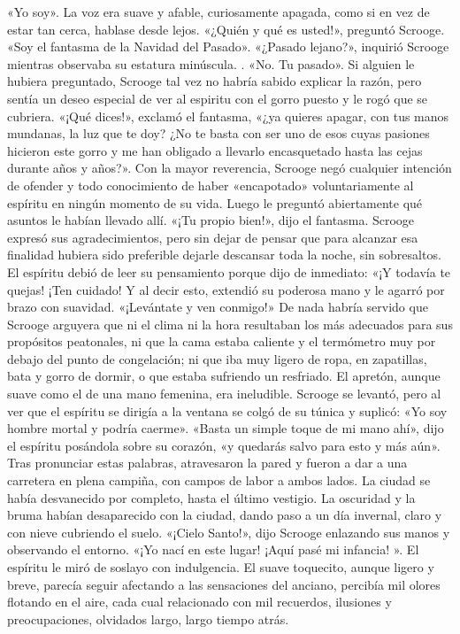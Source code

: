 \documentclass{novela}
\begin{document}
 «Yo soy».
 La voz era suave y afable, curiosamente apagada, como si en vez de estar tan cerca, hablase desde lejos.
 «¿Quién y qué es usted!», preguntó Scrooge.
 «Soy el fantasma de la Navidad del Pasado».
 «¿Pasado lejano?», inquirió Scrooge mientras observaba su estatura minúscula. .
 «No. Tu pasado».
 Si alguien le hubiera preguntado, Scrooge tal vez no habría sabido explicar la razón, pero sentía un deseo especial de ver al espiritu con el gorro puesto y le rogó que se cubriera.
 «¡Qué dices!», exclamó el fantasma, «¿ya quieres apagar, con tus manos mundanas, la luz que te doy? ¿No te basta con ser uno de esos cuyas pasiones hicieron este gorro y me han obligado a llevarlo encasquetado hasta las cejas durante años y años?».
 Con la mayor reverencia, Scrooge negó cualquier intención de ofender y todo conocimiento de haber «encapotado» voluntariamente al espíritu en ningún momento de su vida.
 Luego le preguntó abiertamente qué asuntos le habían llevado allí.
 «¡Tu propio bien!», dijo el fantasma.
 Scrooge expresó sus agradecimientos, pero sin dejar de pensar que para alcanzar esa finalidad hubiera sido preferible dejarle descansar toda la noche, sin sobresaltos. El espíritu debió de leer su pensamiento porque dijo de inmediato:
 «¡Y todavía te quejas! ¡Ten cuidado!
 Y al decir esto, extendió su poderosa mano y le agarró por brazo con suavidad.
 «¡Levántate y ven conmigo!»
 De nada habría servido que Scrooge arguyera que ni el clima ni la hora resultaban los más adecuados para sus propósitos peatonales, ni que la cama estaba caliente y el termómetro muy por debajo del punto de congelación; ni que iba muy ligero de ropa, en zapatillas, bata y gorro de dormir, o que estaba sufriendo un resfriado. El apretón, aunque suave como el de una mano femenina, era ineludible. Scrooge se levantó, pero al ver que el espíritu se dirigía a la ventana se colgó de su túnica y suplicó:
 «Yo soy hombre mortal y podría caerme».
 «Basta un simple toque de mi mano ahí», dijo el espíritu posándola sobre su corazón, «y quedarás salvo para esto y más aún».
 Tras pronunciar estas palabras, atravesaron la pared y fueron a dar a una carretera en plena campiña, con campos de labor a ambos lados. La ciudad se había desvanecido por completo, hasta el último vestigio. La oscuridad y la bruma habían desaparecido con la ciudad, dando paso a un día invernal, claro y con nieve cubriendo el suelo.
 «¡Cielo Santo!», dijo Scrooge enlazando sus manos y observando el entorno. «¡Yo nací en este lugar! ¡Aquí pasé mi infancia! ».
 El espíritu le miró de soslayo con indulgencia. El suave toquecito, aunque ligero y breve, parecía seguir afectando a las sensaciones del anciano, percibía mil olores flotando en el aire, cada cual relacionado con mil recuerdos, ilusiones y preocupaciones, olvidados largo, largo tiempo atrás.
\end{document}
